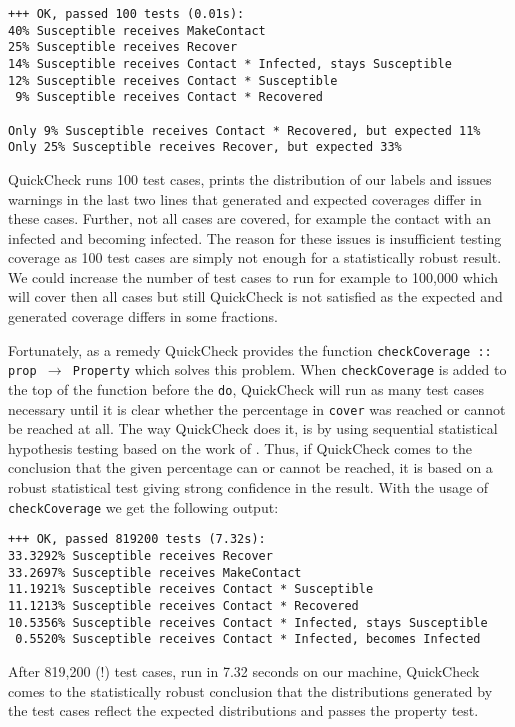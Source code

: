 \begin{footnotesize}
\begin{verbatim}
+++ OK, passed 100 tests (0.01s):
40% Susceptible receives MakeContact
25% Susceptible receives Recover
14% Susceptible receives Contact * Infected, stays Susceptible
12% Susceptible receives Contact * Susceptible
 9% Susceptible receives Contact * Recovered
    
Only 9% Susceptible receives Contact * Recovered, but expected 11%
Only 25% Susceptible receives Recover, but expected 33%
\end{verbatim}
\end{footnotesize}

QuickCheck runs 100 test cases, prints the distribution of our labels and issues warnings in the last two lines that generated and expected coverages differ in these cases. Further, not all cases are covered, for example the contact with an infected and becoming infected. The reason for these issues is insufficient testing coverage as 100 test cases are simply not enough for a statistically robust result. We could increase the number of test cases to run for example to 100,000 which will cover then all cases but still QuickCheck is not satisfied as the expected and generated coverage differs in some fractions.

Fortunately, as a remedy QuickCheck provides the function \texttt{checkCoverage :: prop $\rightarrow$ Property} which solves this problem. When \texttt{checkCoverage} is added to the top of the function before the \texttt{do}, QuickCheck will run as many test cases necessary until it is clear whether the percentage in \texttt{cover} was reached or cannot be reached at all. The way QuickCheck does it, is by using sequential statistical hypothesis testing based on the work of \cite{wald_sequential_1992}. Thus, if QuickCheck comes to the conclusion that the given percentage can or cannot be reached, it is based on a robust statistical test giving strong confidence in the result. With the usage of \texttt{checkCoverage} we get the following output:

\begin{footnotesize}
\begin{verbatim}
+++ OK, passed 819200 tests (7.32s):
33.3292% Susceptible receives Recover
33.2697% Susceptible receives MakeContact
11.1921% Susceptible receives Contact * Susceptible
11.1213% Susceptible receives Contact * Recovered
10.5356% Susceptible receives Contact * Infected, stays Susceptible
 0.5520% Susceptible receives Contact * Infected, becomes Infected
\end{verbatim}
\end{footnotesize}

After 819,200 (!) test cases, run in 7.32 seconds on our machine, QuickCheck comes to the statistically robust conclusion that the distributions generated by the test cases reflect the expected distributions and passes the property test.